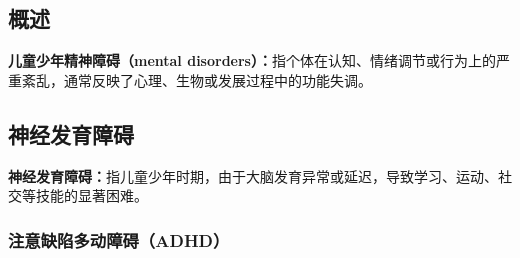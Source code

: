 \subsection{概述}

\begin{defbox}
\textbf{儿童少年精神障碍（mental disorders）：}指个体在认知、情绪调节或行为上的严重紊乱，通常反映了心理、生物或发展过程中的功能失调。
\end{defbox}

\subsection{神经发育障碍}

\begin{defbox}
\textbf{神经发育障碍：}指儿童少年时期，由于大脑发育异常或延迟，导致学习、运动、社交等技能的显著困难。
\end{defbox}

\subsubsection{注意缺陷多动障碍（ADHD）}

